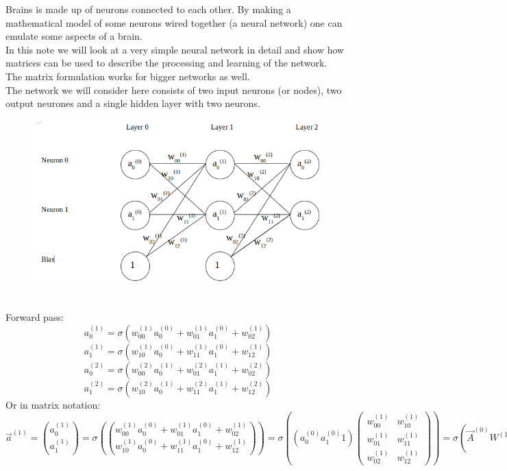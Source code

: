 \documentclass{article}
\begin{document}
Brains is made up of neurons connected to each other. By making a mathematical model of some neurons wired together (a neural network) one can emulate some aspects of a brain.
\\
In this note we will look at a very simple neural network in detail and show how matrices can be used to describe the processing and learning of the network.
\\The matrix formulation works for bigger networks as well.
\\
The network we will consider here consists of two input neurons (or nodes), two output neurones and a single hidden layer with two neurons.
\\
\begin{figure}[h]
\includegraphics[scale=.4]{two_neuron_net}
\centering
\end{figure}
\\
Forward pass:
\begin{equation} \label{eq:a01}
a_0^{(1)} = \sigma(w_{00}^{(1)}a_0^{(0)}+w_{01}^{(1)}a_1^{(0)}+w_{02}^{(1)})
\end{equation}
\begin{equation} \label{eq:a11}
a_1^{(1)} = \sigma(w_{10}^{(1)}a_0^{(0)}+w_{11}^{(1)}a_1^{(0)}+w_{12}^{(1)})
\end{equation}
\begin{equation} \label{eq:a02}
a_0^{(2)} = \sigma(w_{00}^{(2)}a_0^{(1)}+w_{01}^{(2)}a_1^{(1)}+w_{02}^{(2)})
\end{equation}
\begin{equation} \label{eq:a12}
a_1^{(2)} = \sigma(w_{10}^{(2)}a_0^{(1)}+w_{11}^{(2)}a_1^{(1)}+w_{12}^{(2)})
\end{equation}
Or in matrix notation:
\[
\vec a^{(1)} = 
\binom{a_0^{(1)}}{a_1^{(1)}} =
\sigma \left ( \binom{w_{00}^{(1)}a_0^{(0)}+w_{01}^{(1)}a_1^{(0)}+w_{02}^{(1)}}{w_{10}^{(1)}a_0^{(0)}+w_{11}^{(1)}a_1^{(0)}+w_{12}^{(1)}} \right ) 
= \sigma\left((a_0^{(0)} a_1^{(0)} 1)
\begin{pmatrix}
w_{00}^{(1)} & w_{10}^{(1)} \\
w_{01}^{(1)} & w_{11}^{(1)} \\
 w_{02}^{(1)} & w_{12}^{(1)}
\end{pmatrix}\right)
= \sigma(\vec A^{(0)}W^{(1)}) 
\]
\end{document}
